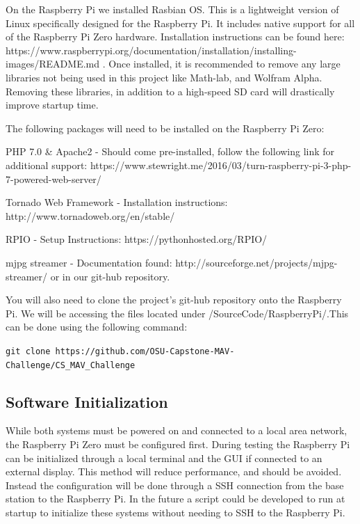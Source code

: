 \documentclass[onecolumn, draftclsnofoot,10pt, compsoc]{IEEEtran}
\begin{document}
On the Raspberry Pi we installed Rasbian OS. This is a lightweight version of Linux specifically designed for the Raspberry Pi. It includes native support for all of the Raspberry Pi Zero hardware. Installation instructions can be found here: https://www.raspberrypi.org/documentation/installation/installing-images/README.md . Once installed, it is recommended to remove any large libraries not being used in this project like Math-lab, and Wolfram Alpha. Removing these libraries, in addition to a high-speed SD card will drastically improve startup time. 

The following packages will need to be installed on the Raspberry Pi Zero:
\begin{description}
\item{PHP 7.0 \& Apache2} - Should come pre-installed, follow the following link for additional support: https://www.stewright.me/2016/03/turn-raspberry-pi-3-php-7-powered-web-server/
\item{Tornado Web Framework} - Installation instructions: http://www.tornadoweb.org/en/stable/
\item{RPIO} - Setup Instructions: https://pythonhosted.org/RPIO/
\item{mjpg streamer} - Documentation found: http://sourceforge.net/projects/mjpg-streamer/ or in our git-hub repository.
\end{description}

You will also need to clone the project's git-hub repository onto the Raspberry Pi. We will be accessing the files located under /SourceCode/RaspberryPi/.This can be done using the following command: 
\newline

\texttt{git clone https://github.com/OSU-Capstone-MAV-Challenge/CS\_MAV\_Challenge} 

\vspace{0.2in}

\subsection{Software Initialization}

While both systems must be powered on and connected to a local area network, the Raspberry Pi Zero must be configured first. During testing the Raspberry Pi can be initialized through a local terminal and the GUI if connected to an external display. This method will reduce performance, and should be avoided. Instead the configuration will be done through a SSH connection from the base station to the Raspberry Pi. In the future a script could be developed to run at startup to initialize these systems without needing to SSH to the Raspberry Pi.
\end{document}
